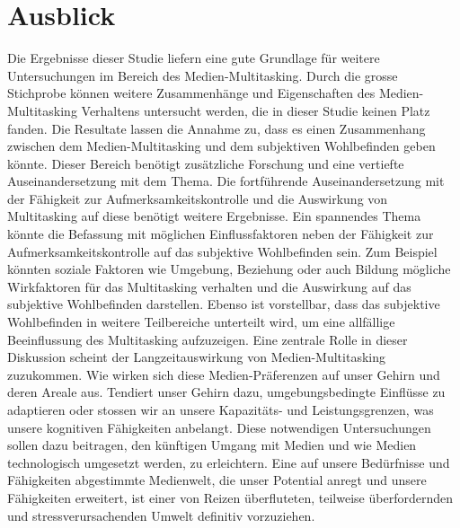 \section{Ausblick}\label{section.diskussion.ausblick}
Die Ergebnisse dieser Studie liefern eine gute Grundlage für weitere Untersuchungen im Bereich des Medien-Multitasking. Durch die grosse Stichprobe können weitere Zusammenhänge und Eigenschaften des Medien-Multitasking Verhaltens untersucht werden, die in dieser Studie keinen Platz fanden. Die Resultate lassen die Annahme zu, dass es einen Zusammenhang zwischen dem Medien-Multitasking und dem subjektiven Wohlbefinden geben könnte. Dieser Bereich benötigt zusätzliche Forschung und eine vertiefte Auseinandersetzung mit dem Thema. Die fortführende Auseinandersetzung mit der Fähigkeit zur Aufmerksamkeitskontrolle und die Auswirkung von Multitasking auf diese benötigt weitere Ergebnisse. Ein spannendes Thema könnte die Befassung mit möglichen Einflussfaktoren neben der Fähigkeit zur Aufmerksamkeitskontrolle auf das subjektive Wohlbefinden sein. Zum Beispiel könnten soziale Faktoren wie Umgebung, Beziehung oder auch Bildung mögliche Wirkfaktoren für das Multitasking verhalten und die Auswirkung auf das subjektive Wohlbefinden darstellen. Ebenso ist vorstellbar, dass das subjektive Wohlbefinden in weitere Teilbereiche unterteilt wird, um eine allfällige Beeinflussung des Multitasking aufzuzeigen. Eine zentrale Rolle in dieser Diskussion scheint der Langzeitauswirkung von Medien-Multitasking zuzukommen. Wie wirken sich diese Medien-Präferenzen auf unser Gehirn und deren Areale aus. Tendiert unser Gehirn dazu, umgebungsbedingte Einflüsse zu adaptieren oder stossen wir an unsere Kapazitäts- und Leistungsgrenzen, was unsere kognitiven Fähigkeiten anbelangt. Diese notwendigen Untersuchungen sollen dazu beitragen, den künftigen Umgang mit Medien und wie Medien technologisch umgesetzt werden, zu erleichtern. Eine auf unsere Bedürfnisse und Fähigkeiten abgestimmte Medienwelt, die unser Potential anregt und unsere Fähigkeiten erweitert, ist einer von Reizen überfluteten, teilweise überfordernden und stressverursachenden Umwelt definitiv vorzuziehen. 

